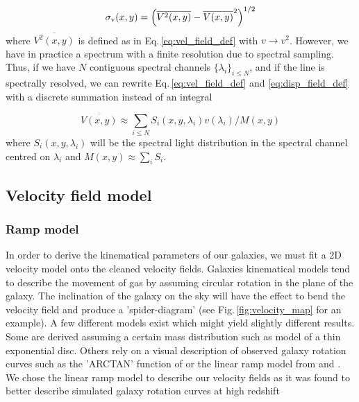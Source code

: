 \begin{equation}
	\sigma_{\rm{v}} (x,y) = \left ( \overline{V^2(x,y)} - \overline{V(x,y)}^2 \right )^{1/2}
	\label{eq:disp_field_def}
\end{equation}
where $\overline{V^2(x,y)}$ is defined as in Eq.\,\ref{eq:vel_field_def} with $v \rightarrow v^2$. However, we have in practice a spectrum with a finite resolution due to spectral sampling. Thus, if we have $N$ contiguous spectral channels $\lbrace \lambda_i \rbrace_{i\leq N}$, and if the line is spectrally resolved, we can rewrite Eq.\,\ref{eq:vel_field_def} and \ref{eq:disp_field_def} with a discrete summation instead of an integral

\begin{equation}
	\overline{V(x,y)} \approx \sum_{i \leq N} S_i(x,y,\lambda_i) v(\lambda_i) / M(x, y)
	\label{eq:vel_field_def_sampled}
\end{equation}
where $S_i(x,y,\lambda_i)$ will be the spectral light distribution in the spectral channel centred on $\lambda_i$ and $M(x,y) \approx \sum_i S_i$.


\subsection{Velocity field model}
\label{subsec:model}
\subsubsection{Ramp model}
\label{subsec:ramp_model}

In order to derive the kinematical parameters of our galaxies, we must fit a 2D velocity model onto the cleaned velocity fields. Galaxies kinematical models tend to describe the movement of gas by assuming circular rotation in the plane of the galaxy. The inclination of the galaxy on the sky will have the effect to bend the velocity field and produce a 'spider-diagram' (see Fig.\,\ref{fig:velocity_map} for an example). A few different models exist which might yield slightly different results. Some are derived assuming a certain mass distribution such as  model of a thin exponential disc. Others rely on a visual description of observed galaxy rotation curves such as the 'ARCTAN' function of  or the linear ramp model from  and .\\


We chose the linear ramp model to describe our velocity fields as it was found to better describe simulated galaxy rotation curves at high redshift

